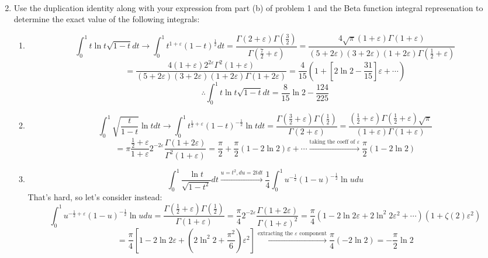 \documentclass{article}
\begin{document}
\begin{enumerate}
\begin{enumerate}
        \\
        \[\]
    \end{enumerate}
    \item Use the duplication identity along with your expression from part (b) of problem 1 and the Beta function integral represenation to determine the exact value of the following integrals:
    \begin{enumerate}
        \item \[\int_{0}^{1} t\ln t \sqrt{1-t} dt \rightarrow \int_{0}^{1} t^{1+\varepsilon} (1-t)^{\frac 1 2}dt = \frac{\Gamma(2+\varepsilon)\Gamma(\frac 3 2)}{\Gamma(\frac 7 2 + \varepsilon)} = \frac{4\sqrt{\pi}(1+\varepsilon)\Gamma(1+\varepsilon)}{(5+2\varepsilon)(3+2\varepsilon)(1+2\varepsilon)\Gamma(\frac 1 2 + \varepsilon)}\]
        \[ = \frac{4(1+\varepsilon)2^{2\varepsilon}\Gamma^2(1+\varepsilon)}{(5+2\varepsilon)(3+2\varepsilon)(1+2\varepsilon)\Gamma(1+2\varepsilon)} = \frac{4}{15}\left(1 + \left[ 2\ln 2 - \frac{31}{15}\right]\varepsilon + \cdots \right)\]
        \[\therefore \int_{0}^{1} t\ln t \sqrt{1-t} dt = \boxed{\frac{8}{15}\ln 2 - \frac{124}{225}}\]
        \item \[\int_{0}^{1} \sqrt{\frac{t}{1-t}}\ln tdt \rightarrow \int_{0}^{1} t^{\frac 1 2 + \varepsilon} (1-t)^{- \frac 1 2}\ln t dt = \frac{\Gamma(\frac 3 2 + \varepsilon)\Gamma(\frac 1 2)}{\Gamma(2 + \varepsilon)} = \frac{(\frac 1 2 + \varepsilon)\Gamma(\frac 1 2 + \varepsilon)\sqrt{\pi}}{(1+\varepsilon)\Gamma(1 + \varepsilon)}\]
        \[ = \pi\frac{\frac 1 2 + \varepsilon}{1 + \varepsilon}2^{-2\varepsilon}\frac{\Gamma(1+2\varepsilon)}{\Gamma^2(1+\varepsilon)} = \frac{\pi}{2} + \frac{\pi}{2} (1-2\ln 2)\varepsilon + \cdots \xrightarrow{\text{taking the coeff of $\varepsilon$}} \boxed{\frac{\pi}{2}(1 - 2 \ln 2)}\]
        \item \[\int_{0}^{1} \frac{\ln t}{\sqrt{1-t^2}}dt \xrightarrow{u=t^2, du=2tdt}\frac 1 4\int_{0}^{1} u^{-\frac 1 2}(1-u)^{-\frac 1 2}\ln u du\]
        That's hard, so let's consider instead:
        \[\int_{0}^{1}u^{-\frac 1 2 + \varepsilon}(1-u)^{-\frac 1 2}\ln u du = \frac{\Gamma(\frac 1 2 + \varepsilon)\Gamma(\frac 1 2)}{\Gamma(1+\varepsilon)}  = \frac {\pi} {4}2^{-2\varepsilon} \frac{\Gamma(1+2\varepsilon)}{\Gamma(1+\varepsilon)^2} = \frac{\pi}{4}\left( 1 - 2 \ln 2 \varepsilon + 2 \ln^2 2\varepsilon^2 + \cdots\right)\left(1 + \zeta(2)\varepsilon^2\right)\]
        \[ = \frac{\pi}{4}\left[ 1-2\ln 2 \varepsilon + \left( 2\ln^2 2 + \frac{\pi^2}{6}\right)\varepsilon^2\right] \xrightarrow{\text{extracting the $\varepsilon$ component} }\frac{\pi}{4}(-2\ln 2) = \boxed{-\frac{\pi}{2} \ln 2}\]

\end{enumerate}
\end{enumerate}
\end{document}
